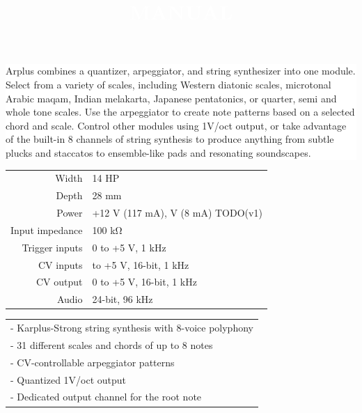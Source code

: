 \documentclass[11pt]{article}
\begin{document}
\pagecolor{black}\afterpage{\nopagecolor}

\title{\textcolor{white}{MANUAL}}
\author{}
\date{}

\begin{minipage}{0.4\textwidth}
\color{white}
\maketitle

\noindent\colorbox{white}
{
\begin{minipage}{0.85\textwidth}\color{black}
Arplus combines a quantizer, arpeggiator, and string synthesizer into one module.
Select from a variety of scales, including
  Western diatonic scales,
  microtonal Arabic maqam,
  Indian melakarta,
  Japanese pentatonics,
  or quarter, semi and whole tone scales.
Use the arpeggiator to create note patterns based on a selected chord and scale.
Control other modules using 1V/oct output, or take advantage of the built-in 8 channels of
string synthesis to produce anything from subtle plucks and staccatos to ensemble-like
pads and resonating soundscapes.
\end{minipage}
}

\vspace{1cm}

\begin{minipage}{0.8\textwidth}\color{white}
\begin{tabular}{@{}rl@{}}
  Width & 14 HP \\
  Depth & 28 mm \\
  Power & +12 V (117 mA), \textminus12 V (8 mA) TODO(v1) \\
  Input impedance & 100 kΩ \\
  Trigger inputs & 0 to +5 V, 1 kHz \\
  CV inputs & \textminus5 to +5 V, 16-bit, 1 kHz \\
  CV output & 0 to +5 V, 16-bit, 1 kHz \\
  Audio & 24-bit, 96 kHz
\end{tabular}
\end{minipage}

\vspace{1cm}

\begin{minipage}{0.8\textwidth}\color{white}
\begin{tabular}{@{}l}
  - Karplus-Strong string synthesis with 8-voice polyphony \\
  - 31 different scales and chords of up to 8 notes \\
  - CV-controllable arpeggiator patterns \\
  - Quantized 1V/oct output \\
  - Dedicated output channel for the root note
\end{tabular}
\end{minipage}

\end{minipage}%
\end{document}
